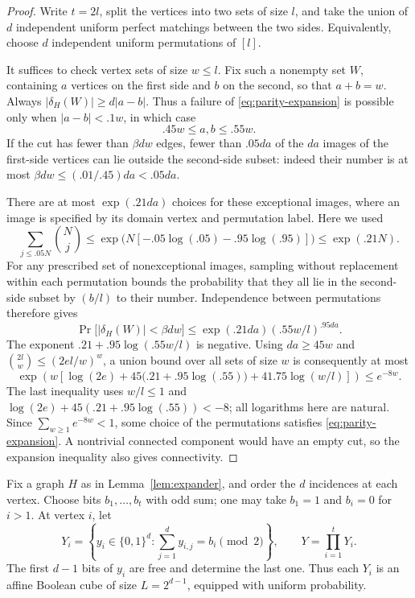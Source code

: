 \begin{proof}
  Write \(t=2l\), split the vertices into two sets of size \(l\), and take
  the union of \(d\) independent uniform perfect matchings between the two
  sides.  Equivalently, choose \(d\) independent uniform permutations of
  \([l]\).

  It suffices to check vertex sets of size \(w\leq l\).  Fix such a
  nonempty set \(W\), containing \(a\) vertices on the first side and
  \(b\) on the second, so that \(a+b=w\).  Always
  \(|\delta_H(W)|\geq d|a-b|\).  Thus a failure of
  \eqref{eq:parity-expansion} is possible only when
  \(|a-b|<.1w\), in which case
  \[
    .45w\leq a,b\leq .55w.
  \]
  If the cut has fewer than \(\beta dw\) edges, fewer than \(.05da\)
  of the \(da\) images of the first-side vertices can lie outside the
  second-side subset: indeed their number is at most
  \(\beta dw\leq (.01/.45)da<.05da\).

  There are at most \(\exp(.21da)\) choices for these exceptional images,
  where an image is specified by its domain vertex and permutation label.
  Here we used
  \[
    \sum_{j\leq .05N}\binom Nj
      \leq \exp\bigl(N[-.05\log(.05)-.95\log(.95)]\bigr)
      \leq \exp(.21N).
  \]
  For any prescribed set of nonexceptional images, sampling without
  replacement within each permutation bounds the probability that they
  all lie in the second-side subset by \((b/l)\) to their number.
  Independence between permutations therefore gives
  \[
    \Pr\bigl[|\delta_H(W)|<\beta dw\bigr]
      \leq \exp(.21da)(.55w/l)^{.95da}.
  \]
  The exponent \(.21+.95\log(.55w/l)\) is negative.  Using
  \(da\geq45w\) and \(\binom{2l}{w}\leq(2el/w)^w\), a union bound
  over all sets of size \(w\) is consequently at most
  \[
    \exp\!\left(
      w\left[\log(2e)+45\bigl(.21+.95\log(.55)\bigr)
                 +41.75\log(w/l)\right]\right)
    \leq e^{-8w}.
  \]
  The last inequality uses \(w/l\leq1\) and
  \(\log(2e)+45(.21+.95\log(.55))<-8\); all logarithms here are
  natural.  Since \(\sum_{w\geq1}e^{-8w}<1\), some choice of the
  permutations satisfies \eqref{eq:parity-expansion}.
  A nontrivial connected component would have an empty cut, so the
  expansion inequality also gives connectivity.
\end{proof}

Fix a graph \(H\) as in Lemma~\ref{lem:expander}, and order the \(d\)
incidences at each vertex.  Choose bits \(b_1,\ldots,b_t\) with odd sum;
one may take \(b_1=1\) and \(b_i=0\) for \(i>1\).  At vertex \(i\),
let
\begin{equation}
  Y_i=\left\{y_i\in\{0,1\}^d:
               \sum_{j=1}^d y_{i,j}=b_i\pmod2\right\},
  \qquad Y=\prod_{i=1}^tY_i.
  \label{eq:parity-domain}
\end{equation}
The first \(d-1\) bits of \(y_i\) are free and determine the last one.
Thus each \(Y_i\) is an affine Boolean cube of size
\(L=2^{d-1}\), equipped with uniform probability.

